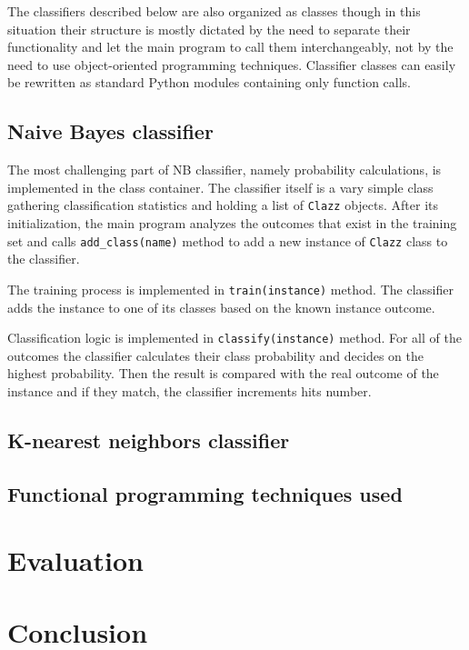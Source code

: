 \documentclass{llncs}
\begin{document}
The classifiers described below are also organized as classes though in this situation their structure is mostly dictated by the need to separate their functionality and let the main program to call them interchangeably, not by the need to use object-oriented programming techniques. Classifier classes can easily be rewritten as standard Python modules containing only function calls.

\subsection{Naive Bayes classifier}

The most challenging part of NB classifier, namely probability calculations, is implemented in the class container. The classifier itself is a vary simple class gathering classification statistics and holding a list of \texttt{Clazz} objects. After its initialization, the main program analyzes the outcomes that exist in the training set and calls \texttt{add\_class(name)} method to add a new instance of \texttt{Clazz} class to the classifier.

The training process is implemented in \texttt{train(instance)} method. The classifier adds the instance to one of its classes based on the known instance outcome.

Classification logic is implemented in \texttt{classify(instance)} method. For all of the outcomes the classifier calculates their class probability and decides on the highest probability. Then the result is compared with the real outcome of the instance and if they match, the classifier increments hits number.

\subsection{K-nearest neighbors classifier}

\subsection{Functional programming techniques used}

\section{Evaluation}

\section{Conclusion}
\end{document}
